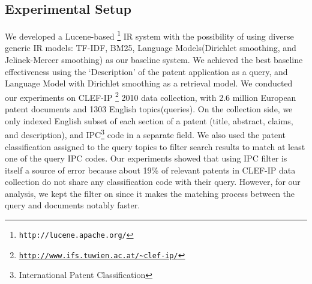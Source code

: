 \documentclass{sig-alternate}
\begin{document}
\subsection{Experimental Setup}
We developed a Lucene-based%
\footnote{\texttt{http://lucene.apache.org/}%
} IR system with the possibility of using diverse generic IR models: TF-IDF, BM25, Language Models(Dirichlet smoothing, and Jelinek-Mercer smoothing) as our baseline system. We achieved the best baseline effectiveness using the `Description' of the patent application as a query\cite{xue2009transforming}, and Language Model with Dirichlet smoothing as a retrieval model. We conducted our experiments on CLEF-IP%
\footnote{\texttt{\url{http://www.ifs.tuwien.ac.at/~clef-ip/}}}%
 2010 data collection, with 2.6 million European patent documents and 1303 English topics(queries). On the collection side, we only indexed English subset of each section of a patent (title, abstract, claims, and description), and IPC\footnote{International Patent Classification}%
  code in a separate field\cite{magdy2012toward}. We also used the patent classification assigned to the query topics to filter search results to match at least one of the query IPC codes\cite{lopez2010patatras}. Our experiments showed that using IPC filter is itself a source of error because about 19\% of relevant patents in CLEF-IP data collection do not share any classification code with their query. However, for our analysis, we kept the filter on since it makes the matching process between the query and documents notably faster.
\end{document}
